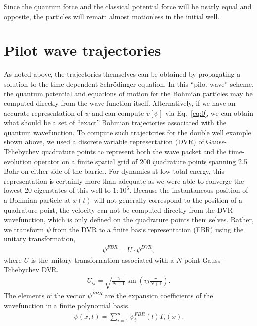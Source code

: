 Since the quantum force and the classical potential force will be 
nearly equal and opposite, the particles will remain almost 
motionless in the initial well.

\section{ Pilot wave trajectories}
As noted above, the trajectories themselves can be obtained by 
propagating a solution to the time-dependent Schr\"odinger equation.  
In this ``pilot wave'' scheme, the quantum potential and equations of 
motion for the Bohmian particles may be computed directly from the 
wave function itself.  Alternatively, if we have an accurate 
representation of $\psi$ and can compute $v[\psi]$ via Eq.~\ref{eq:0}, 
we can obtain what should be a set of ``exact'' Bohmian trajectories 
associated with the quantum wavefunction.  To compute such 
trajectories for the double well example shown above, we used a 
discrete variable representation \cite{ref23} (DVR) of 
Gauss-Tchebychev quadrature points to represent both the wave packet 
and the time-evolution operator on a finite spatial grid of 200 
quadrature points spanning 2.5 Bohr on either side of the barrier.  
For dynamics at low total energy, this representation is certainly 
more than adequate as we were able to converge the lowest 20 
eigenstates of this well to $1:10^6$.  Because the instantaneous 
position of a Bohmian particle at $x(t)$ will not generally correspond 
to the position of a quadrature point, the velocity can not be 
computed directly from the DVR wavefunction, which is only defined on 
the quadrature points them selves.  Rather, we transform $\psi$ from 
the DVR to a finite basis representation (FBR) using the unitary 
transformation,
\begin{eqnarray}
\psi^{FBR}   =   U\cdot\psi^{DVR},    
    \label{eq:39}
\end{eqnarray}
where $U$ is the unitary transformation associated with a $N$-point Gauss-Tchebychev DVR.
\begin{eqnarray}
U_{i j}   =  \sqrt{\frac{2}{N+1}}\sin\left( i  j  \frac{\pi }{N+1}\right).    
    \label{eq:40}
\end{eqnarray}
The elements of the vector $\psi^{FBR}$ are the expansion coefficients of the 
wavefunction in a finite polynomial basis.
\begin{eqnarray}
    \psi(x,t) = \sum_{i=1}^{n}\psi_i^{FBR}(t) {T_i}(x).
    \label{eq:41}
\end{eqnarray}

